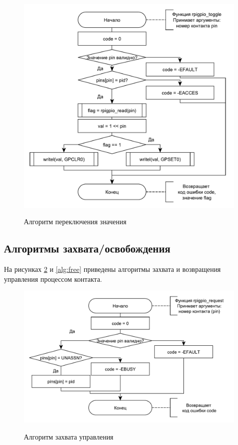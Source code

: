 \begin{figure}[h!] 
	\begin{center}
		{\includegraphics[scale=0.7, angle=0]{img/toggle.pdf}}
		\caption{Алгоритм переключения значения}
		\label{alg:toggle}
	\end{center}
\end{figure}

\subsection{Алгоритмы захвата/освобождения}
На рисунках \ref{alg:request} и \ref{alg:free} приведены алгоритмы захвата и возвращения управления процессом контакта.

\begin{figure}[h!] 
	\begin{center}
		{\includegraphics[scale=0.7, angle=0]{img/request.pdf}}
		\caption{Алгоритм захвата управления}
		\label{alg:request}
	\end{center}
\end{figure}

